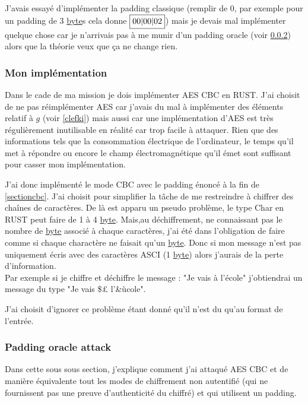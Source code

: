 \documentclass[a4paper, 12pt]{article}
\begin{document}
J'avais essayé d'implémenter la padding classique (remplir de $0$, par exemple pour un padding de 3 \hyperref[byte]{byte}s cela donne $\fbox{00|00|02}$) mais je devais mal implémenter quelque chose car je n'arrivais pas à me munir d'un padding oracle (voir \ref{padoracle}) alors que la théorie veux que ça ne change rien.

\subsubsection{Mon implémentation}
Dans le cade de ma mission je dois implémenter AES CBC en RUST. 
J'ai choisit de ne pas réimplémenter AES car j'avais du mal à implémenter des éléments relatif à $g$ (voir \ref{clefki}) mais aussi car une implémentation d'AES est très régulièrement inutilisable en réalité car trop facile à attaquer. Rien que des informations tels que la consommation électrique de l'ordinateur, le temps qu'il met à répondre ou encore le champ électromagnétique qu'il émet sont suffisant pour casser mon implémentation. 

J'ai donc implémenté le mode CBC avec le padding énoncé à la fin de \ref{sectioncbc}. J'ai choisit pour simplifier la tâche de me restreindre à chiffrer des chaînes de caractères. De là est apparu un pseudo problème, le type Char en RUST peut faire de 1 à 4 \hyperref[byte]{byte}. Mais,au déchiffrement, ne connaissant pas le nombre de \hyperref[byte]{byte} associé à chaque caractères, j'ai été dans l'obligation de faire comme si chaque charactère ne faisait qu'un \hyperref[byte]{byte}. Donc si mon message n'est pas uniquement écris avec des caractères ASCI (1 \hyperref[byte]{byte}) alors j'aurais de la perte d'information. \\
Par exemple si je chiffre et déchiffre le message : "Je vais à l'école" j'obtiendrai un message du type "Je vais \$£ l'\&ùcole".

J'ai choisit d'ignorer ce problème étant donné qu'il n'est du qu'au format de l'entrée.

\subsubsection{Padding oracle attack}\label{padoracle}
Dans cette sous sous section, j'explique comment j'ai attaqué AES CBC et de manière équivalente tout les modes de chiffrement non autentifié (qui ne fournissent pas une preuve d'authenticité du chiffré) et qui utilisent un padding. \\ 
\end{document}
